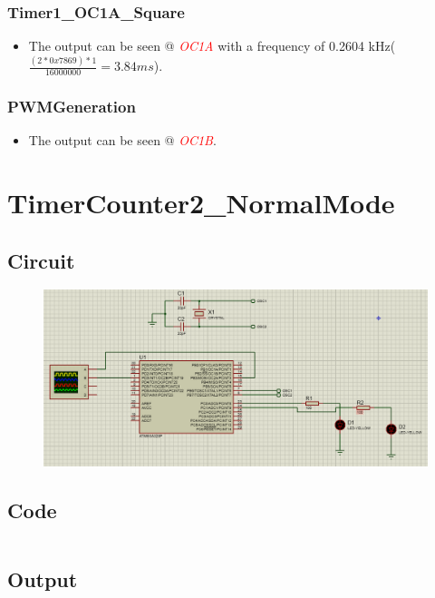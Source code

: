 \documentclass[oneside]{book}
\newcommand{\pinFormat}[1]{\emph{\textcolor{red}{#1}}}
\begin{document}
\subsubsection{Timer1\_OC1A\_Square}
\begin{itemize}
    \item The output can be seen @ \pinFormat{OC1A} with a frequency of 0.2604 kHz($\frac{(2*0x7869) * 1}{16000000} = 3.84 ms$).
\end{itemize}
\subsubsection{PWMGeneration}
\begin{itemize}
    \item The output can be seen @ \pinFormat{OC1B}.
\end{itemize}






\section{TimerCounter2\_NormalMode}
\subsection{Circuit}
\begin{figure}[H]
    \centering
    \includegraphics[height=0.2\textheight]{TimerCounter2_NormalMode.png}
\end{figure}
\subsection{Code}
\inputminted[breaklines, bgcolor=black]{c}{./programFiles/TimerCounter2_NormalMode.c}
\subsection{Output}
\end{document}
